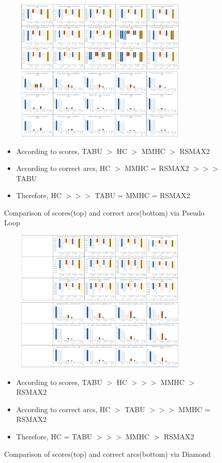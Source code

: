 \documentclass[runningheads,a4paper]{llncs}
\begin{document}
	\begin{figure}
		\centering
		\includegraphics[width=280pt, height=95pt]{images/04_PseudoLoop_Score}
		\includegraphics[width=280pt, height=95pt]{images/04_PseudoLoop_Arcs}
		\caption{Comparison of scores(top) and correct arcs(bottom) via Pseudo Loop}
		{
			\begin{itemize}
				\item According to scores, TABU $>$ HC $>$ MMHC $>$ RSMAX2
				
				\item According to correct arcs, HC $>$ MMHC = RSMAX2 $>>>$ TABU
				
				\item Therefore, {\color{red}HC $>>>$ TABU = MMHC = RSMAX2}
			\end{itemize}
		}
	\end{figure}	




	\begin{figure}
		\centering
		\includegraphics[width=280pt, height=95pt]{images/05_Diamond_Score}
		\includegraphics[width=280pt, height=95pt]{images/05_Diamond_Arcs}
		\caption{Comparison of scores(top) and correct arcs(bottom) via Diamond}
		{
			\begin{itemize}
				\item According to scores, TABU $>$ HC $>>>$ MMHC $>$ RSMAX2
				
				\item According to correct arcs, HC $>$ TABU $>>>$ MMHC = RSMAX2
				
				\item Therefore, {\color{red}HC = TABU $>>>$ MMHC $>$ RSMAX2}
			\end{itemize}
		}
	\end{figure}	
\end{document}
